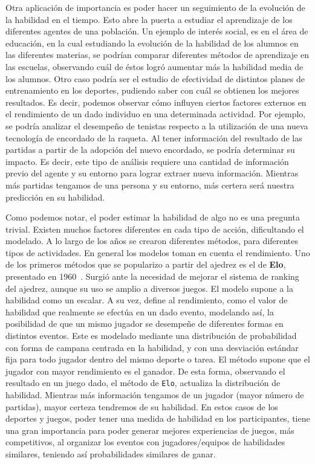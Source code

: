\documentclass[11pt,twoside,spanish]{report} %
\begin{document}
Otra aplicaci\'on de importancia es poder hacer un seguimiento de la evoluci\'on de la habilidad en el tiempo.
Esto abre la puerta a estudiar el aprendizaje de los diferentes agentes de una poblaci\'on.
Un ejemplo de inter\'es social, es en el \'area de educaci\'on, en la cual estudiando la evoluci\'on de la habilidad de los alumnos en las diferentes materias, se podr\'ian comparar diferentes m\'etodos de aprendizaje en las escuelas, observando cu\'al de \'estos logr\'o aumentar m\'as la habilidad media de los alumnos.
Otro caso podr\'ia ser el estudio de efectividad de distintos planes de entrenamiento en los deportes, pudiendo saber con cu\'al se obtienen los mejores resultados.
Es decir, podemos observar c\'omo influyen ciertos factores externos en el rendimiento de un dado individuo en una determinada actividad.
Por ejemplo, se podr\'ia analizar el desempe\~no de tenistas respecto a la utilizaci\'on de una nueva tecnolog\'ia de encordado de la raqueta.
Al tener informaci\'on del resultado de las partidas a partir de la adopci\'on del nuevo encordado, se podr\'ia determinar su impacto.
Es decir, este tipo de an\'alisis requiere una cantidad de informaci\'on previo del agente y su entorno para lograr extraer nueva informaci\'on.
Mientras m\'as partidas tengamos de una persona y su entorno, m\'as certera ser\'a nuestra predicci\'on en su habilidad.

Como podemos notar, el poder estimar la habilidad de algo no es una pregunta trivial.
Existen muchos factores diferentes en cada tipo de acci\'on, dificultando el modelado.
A lo largo de los a\~nos se crearon diferentes m\'etodos, para diferentes tipos de actividades.
En general los modelos toman en cuenta el rendimiento.
Uno de los primeros m\'etodos que se popularizo a partir del ajedrez es el de \textbf{Elo}, presentado en 1960~\cite{elo1961-uscf}.
Surgi\'o ante la necesidad de mejorar el sistema de ranking del ajedrez, aunque su uso se amplio a diversos juegos. 
El modelo supone a la habilidad como un escalar.
A su vez, define al rendimiento, como el valor de habilidad que realmente se efect\'ua en un dado evento, modelando as\'i, la posibilidad de que un mismo jugador se desempe\~ne de diferentes formas en distintos eventos.
Este es modelado mediante una distribuci\'on de probabilidad con forma de campana centrada en la habilidad, y con una desviaci\'on est\'andar fija para todo jugador dentro del mismo deporte o tarea.
El m\'etodo supone que el jugador con mayor rendimiento es el ganador.
De esta forma, observando el resultado en un juego dado, el m\'etodo de \texttt{Elo}, actualiza la distribuci\'on de habilidad.
Mientras m\'as informaci\'on tengamos de un jugador (mayor n\'umero de partidas), mayor certeza tendremos de su habilidad.
En estos casos de los deportes y juegos, poder tener una medida de habilidad en los participantes, tiene una gran importancia para poder generar mejores experiencias de juegos, m\'as competitivos, al organizar los eventos con jugadores/equipos de habilidades similares, teniendo as\'i probabilidades similares de ganar.
\end{document}

